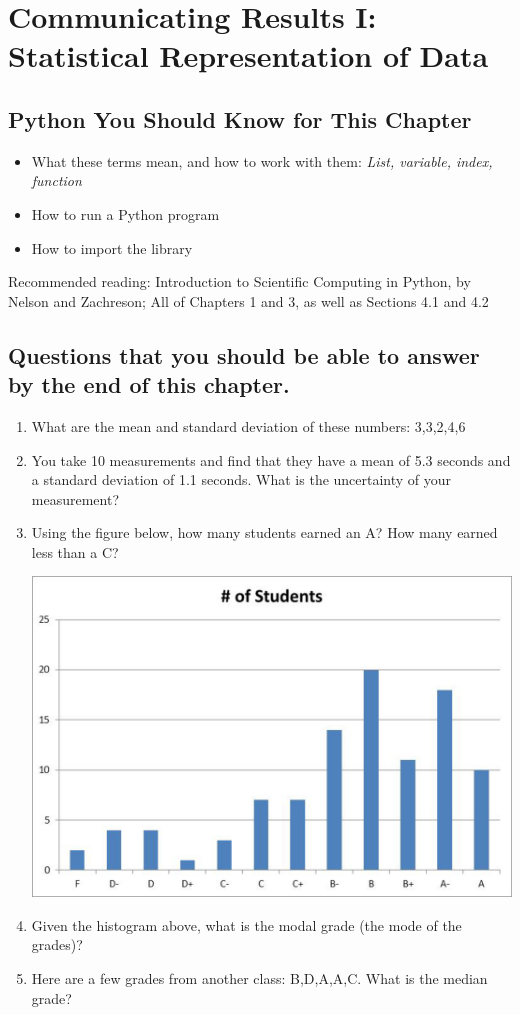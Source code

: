 \documentclass[twoside,11pt,ShortChapTitles]{BYUTextbook}
\begin{document}
\chapter[Statistical Representation of Data]{Communicating Results I: Statistical Representation of Data}

\section*{Python You Should Know for This Chapter}
\begin{itemize}
\item What these terms mean, and how to work with them: {\em List, variable, index, function}
\item How to run a Python program
\item How to import the  library
\end{itemize}
Recommended reading: Introduction to Scientific Computing in Python, by Nelson and Zachreson; All of Chapters 1 and 3, as well as Sections 4.1 and 4.2
\section*{Questions that you should be able to answer by the end of this chapter.}
\begin{enumerate}
\item What are the mean and standard deviation of these numbers: 3,3,2,4,6

\item You take 10 measurements and find that they have a mean of 5.3 seconds and a standard deviation of 1.1 seconds.  What is the uncertainty of your measurement?

\item Using the figure below, how many students earned an A? How many earned less than a C?
\begin{center}
\includegraphics[scale=0.5]{Lab2_figs/hist_few.eps}
\end{center}

\item Given the histogram above, what is the modal grade (the mode of the grades)?

\item  Here are a few grades from another class: B,D,A,A,C.  What is the median grade?
\end{enumerate}
\hrulefill
\end{document}
